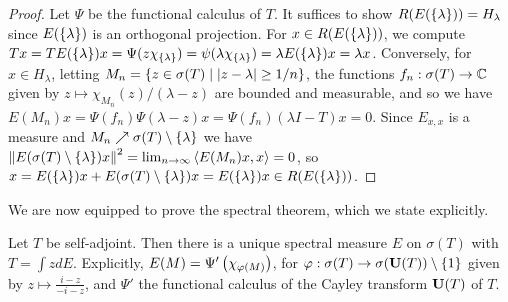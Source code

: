 \documentclass[10pt]{amsart}
\begin{document}
\begin{proof}
    Let $\Psi$ be the functional calculus of $T$. It suffices to show $R(E(\left\{  \lambda  \right\})) = H_\lambda$ since $E(\left\{  \lambda  \right\})$ is an orthogonal projection. For $x \in R(E(\left\{  \lambda  \right\}))$, we compute $Tx = TE(\left\{  \lambda  \right\})x = \Psi(z\chi_{\left\{  \lambda  \right\}}) = \psi(\lambda\chi_{\left\{  \lambda  \right\}}) = \lambda E(\left\{  \lambda  \right\})x = \lambda x$. Conversely, for $x \in H_\lambda$, letting $M_n = \left\{  z \in \sigma(T) \mid \left| z - \lambda \right| \geq 1/n  \right\}$, the functions $f_n : \sigma(T) \to \mathbb{C}$ given by $z \mapsto \chi_{M_n}(z)/(\lambda - z)$ are bounded and measurable, and so we have $E(M_n)x = \Psi(f_n)\Psi(\lambda - z)x = \Psi(f_n)(\lambda I - T)x = 0$. Since $E_{x, x}$ is a measure and $M_n \nearrow \sigma(T) \setminus \left\{  \lambda  \right\}$ we have $\left\| E(\sigma(T) \setminus \left\{  \lambda  \right\})x \right\|^2 = \lim_{n \to \infty}\left\langle E(M_n)x, x \right\rangle = 0$, so $x = E(\left\{  \lambda  \right\})x + E(\sigma(T) \setminus\left\{  \lambda  \right\})x = E(\left\{  \lambda  \right\})x \in R(E(\left\{  \lambda  \right\}))$.
\end{proof}
We are now equipped to prove the spectral theorem, which we state explicitly.
\begin{theorem}
    Let $T$ be self-adjoint. Then there is a unique spectral measure $E$ on $\sigma(T)$ with $T = \int z dE$. Explicitly, $E(M) = \Psi'\left(  \chi_{\varphi(M)}  \right)$, for $\varphi : \sigma(T) \to \sigma(\mathbf{U}(T)) \setminus \left\{  1  \right\}$ given by $z \mapsto \frac{i - z}{-i - z}$, and $\Psi'$ the functional calculus of the Cayley transform $\mathbf{U}(T)$ of $T$.
\end{theorem}
\end{document}
